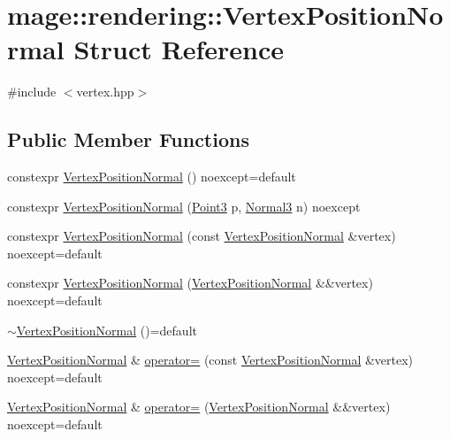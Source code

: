 \hypertarget{structmage_1_1rendering_1_1_vertex_position_normal}{}\section{mage\+:\+:rendering\+:\+:Vertex\+Position\+Normal Struct Reference}
\label{structmage_1_1rendering_1_1_vertex_position_normal}


{\ttfamily \#include $<$vertex.\+hpp$>$}

\subsection*{Public Member Functions}
\begin{DoxyCompactItemize}
\item 
constexpr \mbox{\hyperlink{structmage_1_1rendering_1_1_vertex_position_normal_afa00dc1c7ed3f8c09dc68ee6e7d1c43f}{Vertex\+Position\+Normal}} () noexcept=default
\item 
constexpr \mbox{\hyperlink{structmage_1_1rendering_1_1_vertex_position_normal_a587edfdfb7feecc7b9d9dfea6c2fe632}{Vertex\+Position\+Normal}} (\mbox{\hyperlink{structmage_1_1_point3}{Point3}} p, \mbox{\hyperlink{structmage_1_1_normal3}{Normal3}} n) noexcept
\item 
constexpr \mbox{\hyperlink{structmage_1_1rendering_1_1_vertex_position_normal_a055a98c2d6f827b94fed59bbed300c9e}{Vertex\+Position\+Normal}} (const \mbox{\hyperlink{structmage_1_1rendering_1_1_vertex_position_normal}{Vertex\+Position\+Normal}} \&vertex) noexcept=default
\item 
constexpr \mbox{\hyperlink{structmage_1_1rendering_1_1_vertex_position_normal_a7d090031c9fce5c0e997d92083bb40d0}{Vertex\+Position\+Normal}} (\mbox{\hyperlink{structmage_1_1rendering_1_1_vertex_position_normal}{Vertex\+Position\+Normal}} \&\&vertex) noexcept=default
\item 
\mbox{\hyperlink{structmage_1_1rendering_1_1_vertex_position_normal_ac5abfb1132d54581b006cd098f533811}{$\sim$\+Vertex\+Position\+Normal}} ()=default
\item 
\mbox{\hyperlink{structmage_1_1rendering_1_1_vertex_position_normal}{Vertex\+Position\+Normal}} \& \mbox{\hyperlink{structmage_1_1rendering_1_1_vertex_position_normal_a0224bd11f327b787cc8a457857764bda}{operator=}} (const \mbox{\hyperlink{structmage_1_1rendering_1_1_vertex_position_normal}{Vertex\+Position\+Normal}} \&vertex) noexcept=default
\item 
\mbox{\hyperlink{structmage_1_1rendering_1_1_vertex_position_normal}{Vertex\+Position\+Normal}} \& \mbox{\hyperlink{structmage_1_1rendering_1_1_vertex_position_normal_aa46458a0fb21c67e2581c4e98deb6fc4}{operator=}} (\mbox{\hyperlink{structmage_1_1rendering_1_1_vertex_position_normal}{Vertex\+Position\+Normal}} \&\&vertex) noexcept=default
\end{DoxyCompactItemize}

